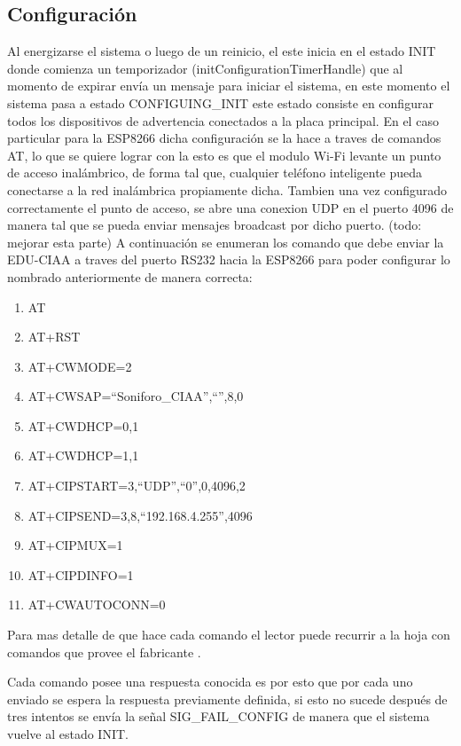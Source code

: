 \subsection{Configuración}
Al energizarse el sistema o luego de un reinicio, el este inicia en el estado INIT donde comienza un temporizador (initConfigurationTimerHandle) que al momento de expirar envía un mensaje para iniciar el sistema, en este momento el sistema pasa a estado CONFIGUING\_INIT este estado consiste en configurar todos los dispositivos de advertencia conectados a la placa principal. 
En el caso particular para la ESP8266 dicha configuración se la hace a traves de comandos AT, lo que se quiere lograr con la esto es que el modulo Wi-Fi levante un punto de acceso inalámbrico, de forma tal que, cualquier teléfono inteligente pueda conectarse a la red inalámbrica propiamente dicha. Tambien una vez configurado correctamente el punto de acceso, se abre una conexion UDP en el puerto 4096 de manera tal que se pueda enviar mensajes broadcast por dicho puerto. (todo: mejorar esta parte)
A continuación se enumeran los comando que debe enviar la EDU-CIAA a traves del puerto RS232 hacia la ESP8266 para poder configurar lo nombrado anteriormente de manera correcta:

\begin{enumerate}
\item{AT}
\item{AT+RST}
\item{AT+CWMODE=2}
\item{AT+CWSAP=``Soniforo\_CIAA'',``'',8,0}
\item{AT+CWDHCP=0,1}
\item{AT+CWDHCP=1,1}
\item{AT+CIPSTART=3,``UDP'',``0'',0,4096,2}
\item{AT+CIPSEND=3,8,``192.168.4.255'',4096}
\item{AT+CIPMUX=1}
\item{AT+CIPDINFO=1}
\item{AT+CWAUTOCONN=0}
\end{enumerate}

Para mas detalle de que hace cada comando el lector puede recurrir a la hoja con comandos que provee el fabricante \citep{esp8266command}.

Cada comando posee una respuesta conocida es por esto que por cada uno enviado se espera la respuesta previamente definida, si esto no sucede después de tres intentos se envía la señal SIG\_FAIL\_CONFIG de manera que el sistema vuelve al estado INIT.

